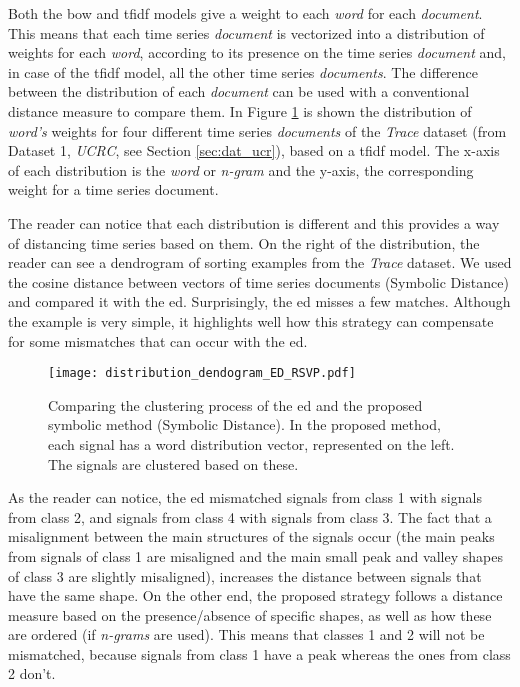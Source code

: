 Both the \gls{bow} and \gls{tfidf} models give a weight to each \textit{word} for each \textit{document}. This means that each time series \textit{document} is vectorized into a distribution of weights for each \textit{word}, according to its presence on the time series \textit{document} and, in case of the \gls{tfidf} model, all the other time series \textit{documents}. The difference between the distribution of each \textit{document} can be used with a conventional distance measure to compare them. In Figure \ref{fig:distribution_dendogram} is shown the distribution of \textit{word's} weights for four different time series \textit{documents} of the \textit{Trace} dataset (from Dataset 1, \textit{UCRC}, see Section \ref{sec:dat_ucr}), based on a \gls{tfidf} model. The x-axis of each distribution is the \textit{word} or \textit{n-gram} and the y-axis, the corresponding weight for a time series document.
\par
The reader can notice that each distribution is different and this provides a way of distancing time series based on them. On the right of the distribution, the reader can see a dendrogram of sorting examples from the \textit{Trace} dataset. We used the cosine distance between vectors of time series documents (Symbolic Distance) and compared it with the \gls{ed}. Surprisingly, the \gls{ed} misses a few matches. Although the example is very simple, it highlights well how this strategy can compensate for some mismatches that can occur with the \gls{ed}.

\begin{figure}
    \centering
    \texttt{[image: distribution\_dendogram\_ED\_RSVP.pdf]}
    \caption{Comparing the clustering process of the \gls{ed} and the proposed symbolic method (Symbolic Distance). In the proposed method, each signal has a word distribution vector, represented on the left. The signals are clustered based on these.}
    \label{fig:distribution_dendogram}
\end{figure}
 
As the reader can notice, the \gls{ed} mismatched signals from class 1 with signals from class 2, and signals from class 4 with signals from class 3. The fact that a misalignment between the main structures of the signals occur (the main peaks from signals of class 1 are misaligned and the main small peak and valley shapes of class 3 are slightly misaligned), increases the distance between signals that have the same shape. On the other end, the proposed strategy follows a distance measure based on the presence/absence of specific shapes, as well as how these are ordered (if \textit{n-grams} are used). This means that classes 1 and 2 will not be mismatched, because signals from class 1 have a peak whereas the ones from class 2 don't.

